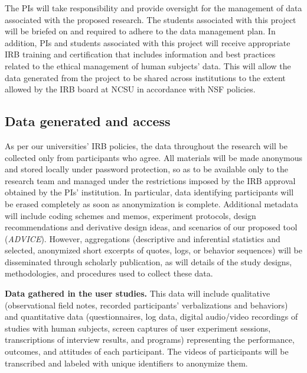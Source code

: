 
The PIs will take responsibility and provide oversight for the management of data associated with the proposed research. The students associated with this project will be briefed on and required to adhere to the data management plan. In addition, PIs and students associated with this project will receive appropriate IRB training and certification that includes information and best practices related to the ethical management of human subjects’ data. This will allow the data generated from the project to be shared across institutions to the extent allowed by the IRB board at NCSU in accordance with NSF policies.

\subsection{Data generated and access}
As per our universities’ IRB policies, the data throughout the research will be collected only from participants who agree. All materials will be made anonymous and stored locally under password protection, so as to be available only to the research team and managed under the restrictions imposed by the IRB approval obtained by the PIs’ institution. In particular, data identifying participants will be erased completely as soon as anonymization is complete. Additional metadata will include coding schemes and memos, experiment protocols, design recommendations and derivative design ideas, and scenarios of our proposed tool (\textit{ADVICE}). However, aggregations (descriptive and inferential statistics and selected, anonymized short excerpts of quotes, logs, or behavior sequences) will be disseminated through scholarly publication, as will details of the study designs, methodologies, and procedures used to collect these data. 

\textbf{Data gathered in the user studies.} This data will include qualitative (observational field notes, recorded participants’ verbalizations and behaviors) and quantitative data (questionnaires, log data, digital audio/video recordings of studies with human subjects, screen captures of user experiment sessions, transcriptions of interview results, and programs) representing the performance, outcomes, and attitudes of each participant. The videos of participants will be transcribed and labeled with unique identifiers to anonymize them. 

